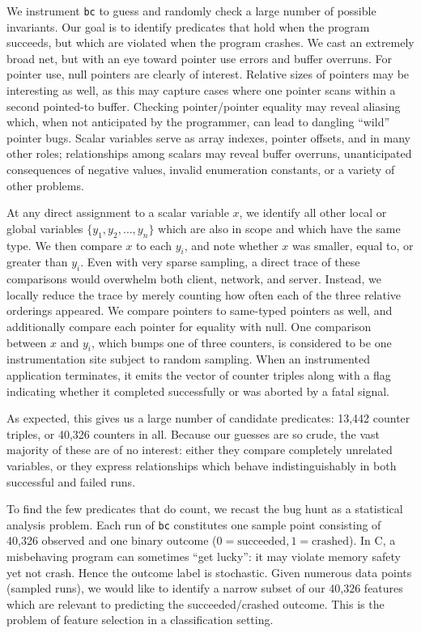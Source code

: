We instrument \texttt{bc} to guess and randomly check a large number
of possible invariants.  Our goal is to identify predicates that hold
when the program succeeds, but which are violated when the program
crashes.  We cast an extremely broad net, but with an eye toward
pointer use errors and buffer overruns.  For pointer use, null
pointers are clearly of interest.  Relative sizes of pointers may be
interesting as well, as this may capture cases where one pointer scans
within a second pointed-to buffer.  Checking pointer/pointer equality
may reveal aliasing which, when not anticipated by the programmer, can
lead to dangling ``wild'' pointer bugs.  Scalar variables serve as
array indexes, pointer offsets, and in many other roles; relationships
among scalars may reveal buffer overruns, unanticipated consequences
of negative values, invalid enumeration constants, or a variety of
other problems.

At any direct assignment to a scalar variable $x$, we identify all
other local or global variables $\{ y_1, y_2, \dots, y_n \}$ which are
also in scope and which have the same type.  We then compare $x$ to
each $y_i$, and note whether $x$ was smaller, equal to, or greater
than $y_i$.  Even with very sparse sampling, a direct trace of these
comparisons would overwhelm both client, network, and server.
Instead, we locally reduce the trace by merely counting how often each
of the three relative orderings appeared.  We compare pointers to
same-typed pointers as well, and additionally compare each pointer for
equality with null.  One comparison between $x$ and $y_i$, which bumps
one of three counters, is considered to be one instrumentation site
subject to random sampling.  When an instrumented application
terminates, it emits the vector of counter triples along with a flag
indicating whether it completed successfully or was aborted by a fatal
signal.

As expected, this gives us a large number of candidate predicates:
13,442 counter triples, or 40,326 counters in all.  Because our
guesses are so crude, the vast majority of these are of no interest:
either they compare completely unrelated variables, or they express
relationships which behave indistinguishably in both successful and
failed runs.

To find the few predicates that do count, we recast the bug hunt as a
statistical analysis problem.  Each run of \texttt{bc} constitutes one
sample point consisting of 40,326 observed  and one
binary outcome ($0 = \text{succeeded}, 1 = \text{crashed}$).  In C, a
misbehaving program can sometimes ``get lucky'': it may violate memory
safety yet not crash.  Hence the outcome label is stochastic.  Given
numerous data points (sampled runs), we would like to identify a
narrow subset of our 40,326 features which are relevant to predicting
the succeeded/crashed outcome.  This is the problem of feature
selection in a classification setting.

